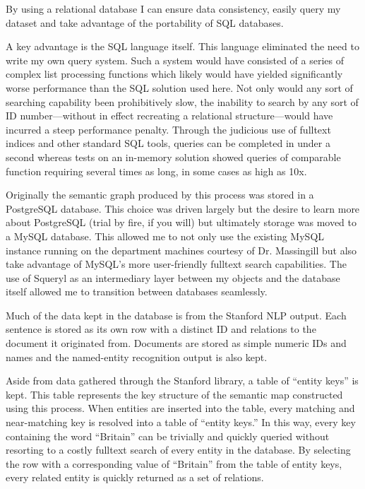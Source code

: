 By using a relational database I can ensure data consistency, easily query my dataset and take advantage of the portability of SQL databases.

A key advantage is the SQL language itself.  This language eliminated the need to write my own query system.  Such a system would have consisted of a series of complex list processing functions which likely would have yielded significantly worse performance than the SQL solution used here.  Not only would any sort of searching capability been prohibitively slow, the inability to search by any sort of ID number---without in effect recreating a relational structure---would have incurred a steep performance penalty.  Through the judicious use of fulltext indices and other standard SQL tools, queries can be completed in under a second whereas tests on an in-memory solution showed queries of comparable function requiring several times as long, in some cases as high as 10x.

Originally the semantic graph produced by this process was stored in a PostgreSQL database.  This choice was driven largely but the desire to learn more about PostgreSQL (trial by fire, if you will) but ultimately storage was moved to a MySQL database.  This allowed me to not only use the existing MySQL instance running on the department machines courtesy of Dr. Massingill but also take advantage of MySQL's more user-friendly fulltext search capabilities.  The use of Squeryl \cite{squeryl} as an intermediary layer between my objects and the database itself allowed me to transition between databases seamlessly.  

Much of the data kept in the database is from the Stanford NLP output. Each sentence is stored as its own row with a distinct ID and relations to the document it originated from.  Documents are stored as simple numeric IDs and names and the named-entity recognition output is also kept.  

Aside from data gathered through the Stanford library, a table of ``entity keys'' is kept.  This table represents the key structure of the semantic map constructed using this process.  When entities are inserted into the table, every matching and near-matching key is resolved into a table of ``entity keys.''  In this way, every key containing the word ``Britain'' can be trivially and quickly queried without resorting to a costly fulltext search of every entity in the database.  By selecting the row with a corresponding value of ``Britain'' from the table of entity keys, every related entity is quickly returned as a set of relations.


